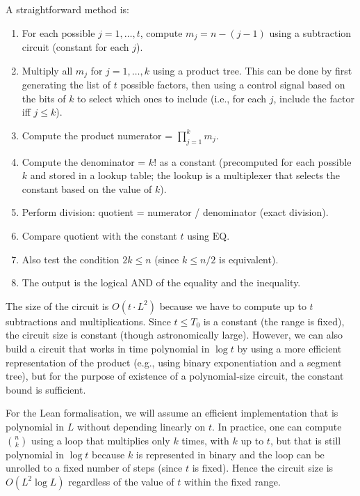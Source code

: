 \documentclass[11pt,a4paper]{article}
\begin{document}
A straightforward method is:

\begin{enumerate}
\item For each possible \(j = 1,\dots,t\), compute \(m_j = n - (j-1)\) using a subtraction circuit (constant for each \(j\)).
\item Multiply all \(m_j\) for \(j=1,\dots,k\) using a product tree. This can be done by first generating the list of \(t\) possible factors, then using a control signal based on the bits of \(k\) to select which ones to include (i.e., for each \(j\), include the factor iff \(j \le k\)).
\item Compute the product numerator = \(\prod_{j=1}^{k} m_j\).
\item Compute the denominator = \(k!\) as a constant (precomputed for each possible \(k\) and stored in a lookup table; the lookup is a multiplexer that selects the constant based on the value of \(k\)).
\item Perform division: quotient = numerator / denominator (exact division).
\item Compare quotient with the constant \(t\) using \(\mathrm{EQ}\).
\item Also test the condition \(2k \le n\) (since \(k \le n/2\) is equivalent).
\item The output is the logical AND of the equality and the inequality.
\end{enumerate}

The size of the circuit is \(O(t \cdot L^2)\) because we have to compute up to \(t\) subtractions and multiplications. Since \(t \le T_0\) is a constant (the range is fixed), the circuit size is constant (though astronomically large). However, we can also build a circuit that works in time polynomial in \(\log t\) by using a more efficient representation of the product (e.g., using binary exponentiation and a segment tree), but for the purpose of existence of a polynomial‑size circuit, the constant bound is sufficient.

For the Lean formalisation, we will assume an efficient implementation that is polynomial in \(L\) without depending linearly on \(t\). In practice, one can compute \(\binom{n}{k}\) using a loop that multiplies only \(k\) times, with \(k\) up to \(t\), but that is still polynomial in \(\log t\) because \(k\) is represented in binary and the loop can be unrolled to a fixed number of steps (since \(t\) is fixed). Hence the circuit size is \(O(L^2 \log L)\) regardless of the value of \(t\) within the fixed range.
\end{document}
